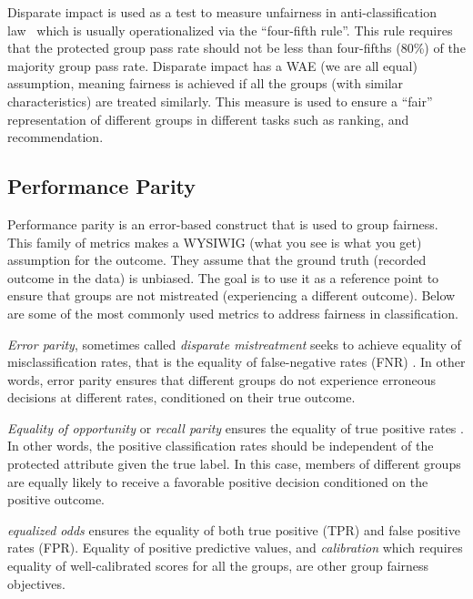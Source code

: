         Disparate impact is used as a test to measure unfairness in anti-classification law~\cite{corbett2018measure} which is usually operationalized via the ``four-fifth rule''. This rule requires that the protected group pass rate should not be less than four-fifths (80\%) of the majority group pass rate. Disparate impact has a WAE (we are all equal) assumption, meaning fairness is achieved if all the groups (with similar characteristics) are treated similarly. This measure is used to ensure a ``fair'' representation of different groups in different tasks such as ranking\cite{singh2018fairness,zehlike2017fa,yang2017measuring}, and recommendation\cite{mehtora2018towards,ekstrand2018exploring}.
    
    \subsection{Performance Parity}
        Performance parity is an error-based construct that is used to group fairness. This family of metrics makes a WYSIWIG (what you see is what you get) assumption for the outcome. They assume that the ground truth (recorded outcome in the data) is unbiased. The goal is to use it as a reference point to ensure that groups are not mistreated (experiencing a different outcome). Below are some of the most commonly used metrics to address fairness in classification.
        
        \textit{Error parity}, sometimes called \textit{disparate mistreatment} seeks to achieve equality of misclassification rates, that is the equality of false-negative rates (FNR) \cite{zafar2017fairness}. In other words, error parity ensures that different groups do not experience erroneous decisions at different rates, conditioned on their true outcome.
        
        \textit{Equality of opportunity} or \textit{recall parity} ensures the equality of true positive rates \cite{hardt2016equality}. In other words, the positive classification rates should be independent of the protected attribute given the true label. In this case, members of different groups are equally likely to receive a favorable positive decision conditioned on the positive outcome.
        
        \textit{equalized odds} \cite{hardt2016equality} ensures the equality of both true positive (TPR) and false positive rates (FPR). Equality of positive predictive values, and \textit{calibration} \cite{Kleinberg:InherentTrade} which requires equality of well-calibrated scores for all the groups, are other group fairness objectives.
        
